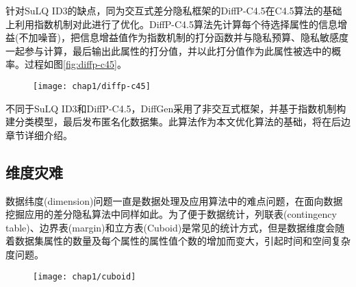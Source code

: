 针对SuLQ ID3的缺点，同为交互式差分隐私框架的DiffP-C4.5\cite{diffp-c4.5}在C4.5算法的基础上利用指数机制对此进行了优化。DiffP-C4.5算法先计算每个待选择属性的信息增益(不加噪音)，把信息增益值作为指数机制的打分函数并与隐私预算、隐私敏感度一起参与计算，最后输出此属性的打分值，并以此打分值作为此属性被选中的概率。过程如图\ref{fig:diffp-c45}。

\begin{figure}[!htp]
	\centering
	\texttt{[image: chap1/diffp-c45]}
\end{figure}

不同于SuLQ ID3和DiffP-C4.5，DiffGen\cite{DiffGen}采用了非交互式框架，并基于指数机制构建分类模型，最后发布匿名化数据集。此算法作为本文优化算法的基础，将在后边章节详细介绍。

\subsection{维度灾难}

数据纬度(dimension)问题一直是数据处理及应用算法中的难点问题，在面向数据挖掘应用的差分隐私算法中同样如此。为了便于数据统计，列联表(contingency table)、边界表(margin)和立方表(Cuboid)是常见的统计方式，但是数据维度会随着数据集属性的数量及每个属性的属性值个数的增加而变大，引起时间和空间复杂度问题。

\begin{figure}[!htp]
	\centering
	\texttt{[image: chap1/cuboid]}
\end{figure}
